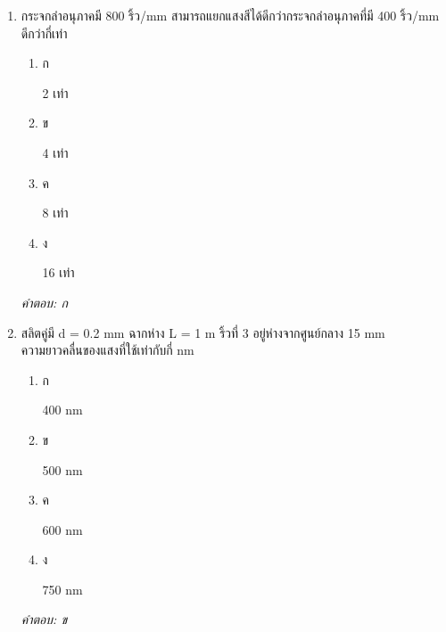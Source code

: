 \documentclass[12pt]{article}
\begin{document}
\begin{enumerate}[label=\arabic*., itemsep=0.5\baselineskip, topsep=0.5\baselineskip, leftmargin=*]
\item กระจกลำอนุภาคมี 800 ริ้ว/mm สามารถแยกแสงสีได้ดีกว่ากระจกลำอนุภาคที่มี 400 ริ้ว/mm ดีกว่ากี่เท่า
\begin{enumerate}[label=\alph*)., itemsep=0.3\baselineskip, topsep=0.3\baselineskip]
\item ก\ 
\begin{minipage}[t]{0.9\linewidth}
\raggedright 2 เท่า
\end{minipage}
\item ข\ 
\begin{minipage}[t]{0.9\linewidth}
\raggedright 4 เท่า
\end{minipage}
\item ค\ 
\begin{minipage}[t]{0.9\linewidth}
\raggedright 8 เท่า
\end{minipage}
\item ง\ 
\begin{minipage}[t]{0.9\linewidth}
\raggedright 16 เท่า
\end{minipage}
\end{enumerate}
\vspace{-0.3\baselineskip}
\begin{small}
\textit{คำตอบ: ก}
\end{small}

\item สลิตคู่มี d = 0.2 mm ฉากห่าง L = 1 m ริ้วที่ 3 อยู่ห่างจากศูนย์กลาง 15 mm ความยาวคลื่นของแสงที่ใช้เท่ากับกี่ nm
\begin{enumerate}[label=\alph*)., itemsep=0.3\baselineskip, topsep=0.3\baselineskip]
\item ก\ 
\begin{minipage}[t]{0.9\linewidth}
\raggedright 400 nm
\end{minipage}
\item ข\ 
\begin{minipage}[t]{0.9\linewidth}
\raggedright 500 nm
\end{minipage}
\item ค\ 
\begin{minipage}[t]{0.9\linewidth}
\raggedright 600 nm
\end{minipage}
\item ง\ 
\begin{minipage}[t]{0.9\linewidth}
\raggedright 750 nm
\end{minipage}
\end{enumerate}
\vspace{-0.3\baselineskip}
\begin{small}
\textit{คำตอบ: ข}
\end{small}


\end{enumerate}
\end{document}
